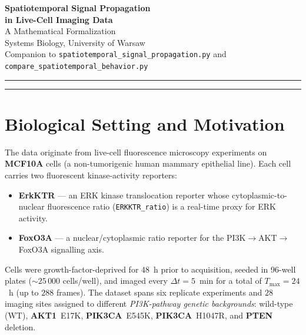 \documentclass[11pt,a4paper]{article}
\theoremstyle{definition}
\theoremstyle{plain}
\newcommand{\1}[1]{\mathbf{1}\!\left[#1\right]}
\begin{document}
\begin{center}
  {\LARGE\bfseries\color{mathblue}
    Spatiotemporal Signal Propagation\\[4pt]
    in Live-Cell Imaging Data}\\[10pt]
  {\large A Mathematical Formalization}\\[6pt]
  {\normalsize Systems Biology, University of Warsaw}\\[4pt]
  {\small\color{gray}
    Companion to \texttt{spatiotemporal\_signal\_propagation.py}
    and \texttt{compare\_spatiotemporal\_behavior.py}}
\end{center}

\vspace{0.5em}
\noindent\rule{\linewidth}{0.8pt}
\vspace{1em}

\tableofcontents
\bigskip
\noindent\rule{\linewidth}{0.4pt}
\bigskip

\section{Biological Setting and Motivation}

The data originate from live-cell fluorescence microscopy experiments on
\textbf{MCF10A} cells (a non-tumorigenic human mammary epithelial line). Each
cell carries two fluorescent kinase-activity reporters:

\begin{itemize}
  \item \textbf{ErkKTR} --- an ERK kinase translocation reporter whose
        cytoplasmic-to-nuclear fluorescence ratio (\texttt{ERKKTR\_ratio})
        is a real-time proxy for ERK activity.
  \item \textbf{FoxO3A} --- a nuclear/cytoplasmic ratio reporter for the
        PI3K$\to$AKT$\to$FoxO3A signalling axis.
\end{itemize}

Cells were growth-factor-deprived for 48~h prior to acquisition, seeded in
96-well plates ($\sim 25\,000$ cells/well), and imaged every
$\Delta t = 5$~min for a total of $T_{\max} = 24$~h (up to $288$ frames).
The dataset spans six replicate experiments and $28$ imaging sites assigned to
different \emph{PI3K-pathway genetic backgrounds}: wild-type (WT),
\textbf{AKT1}~E17K, \textbf{PIK3CA}~E545K, \textbf{PIK3CA}~H1047R, and
\textbf{PTEN} deletion.
\end{document}
